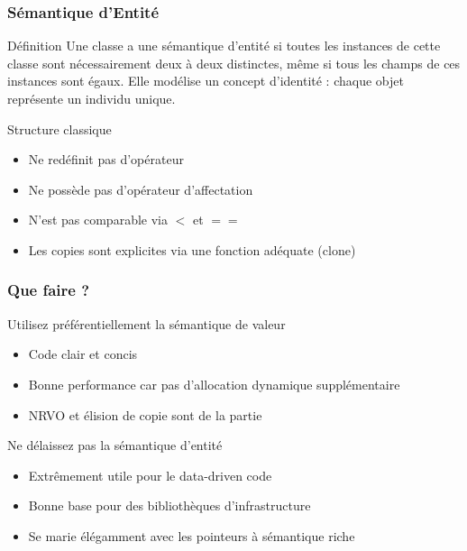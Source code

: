 \documentclass[svgnames]{beamer}
\begin{document}
\frame
{
 \frametitle{Sémantique d'Entité }
  \begin{block}{Définition}
Une classe a une sémantique d'entité si toutes les instances de
cette classe sont nécessairement deux à deux distinctes, même si
tous les champs de ces instances sont égaux. Elle modélise un concept d'identité : chaque objet représente un
individu unique.
  \end{block}

  \begin{block}{Structure classique}
  \begin{itemize}
  \footnotesize
  \item Ne redéfinit pas d'opérateur
  \item Ne possède pas d'opérateur d'affectation
  \item N'est pas comparable via $<$ et $==$
  \item Les copies sont explicites via une fonction adéquate (clone)
  \end{itemize}
  \end{block}
}

\frame
{
 \frametitle{Que faire ?}
  \begin{block}{Utilisez préférentiellement la sémantique de valeur}
  \begin{itemize}
  \footnotesize
  \item Code clair et concis
  \item Bonne performance car pas d'allocation dynamique supplémentaire
  \item NRVO et élision de copie sont de la partie
  \end{itemize}
  \end{block}

  \begin{block}{Ne délaissez pas la sémantique d'entité}
  \begin{itemize}
  \footnotesize
  \item Extrêmement utile pour le data-driven code
  \item Bonne base pour des bibliothèques d'infrastructure
  \item Se marie élégamment avec les pointeurs à sémantique riche
  \end{itemize}
  \end{block}
}
\end{document}
